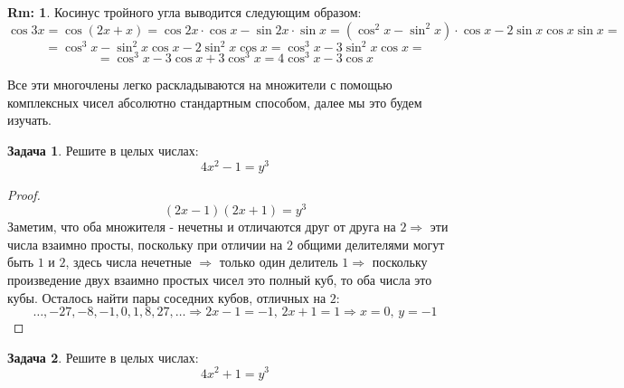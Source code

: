\documentclass[12pt]{article}
\theoremstyle{definition}
\newtheorem{rem}{Rm:}
\newtheorem{problem}{Задача}
\begin{document}
\begin{rem}
	Косинус тройного угла выводится следующим образом:
	$$
		\cos{3x} = \cos{(2x + x)} = \cos{2x}{\cdot}\cos{x} - \sin{2x}{\cdot}\sin{x} = (\cos^2{x} - \sin^2{x}){\cdot}\cos{x} - 2\sin{x}\cos{x}\sin{x} =
	$$
	$$
		= \cos^3{x} - \sin^2{x}\cos{x} - 2\sin^2{x} \cos{x} = \cos^3{x} - 3\sin^2{x}\cos{x} = 
	$$
	$$
		=\cos^3{x} - 3 \cos{x} + 3\cos^3{x} = 4\cos^3{x} - 3\cos{x}
	$$
\end{rem}
Все эти многочлены легко раскладываются на множители с помощью комплексных чисел абсолютно стандартным способом, далее мы это будем изучать.

\begin{problem}
	Решите в целых числах:
	$$
		4x^2 - 1 = y^3
	$$
\end{problem}
\begin{proof}
	$$
		(2x - 1)(2x + 1) = y^3
	$$
	Заметим, что оба множителя - нечетны и отличаются друг от друга на $2 \Rightarrow$ эти числа взаимно просты, поскольку при отличии на $2$ общими делителями могут быть $1$ и $2$, здесь числа нечетные $\Rightarrow$ только один делитель $1 \Rightarrow$ поскольку произведение двух взаимно простых чисел это полный куб, то оба числа это кубы. Осталось найти пары соседних кубов, отличных на $2$:
	$$
		\dotsc, -27, -8, -1, 0, 1, 8, 27, \dotsc \Rightarrow 2x -1 = -1, \, 2x + 1 = 1 \Rightarrow x = 0, \, y  = -1
	$$
\end{proof}
\newpage
\begin{problem}
	Решите в целых числах:
	$$
		4x^2 + 1 = y^3
	$$
\end{problem}
\end{document}
